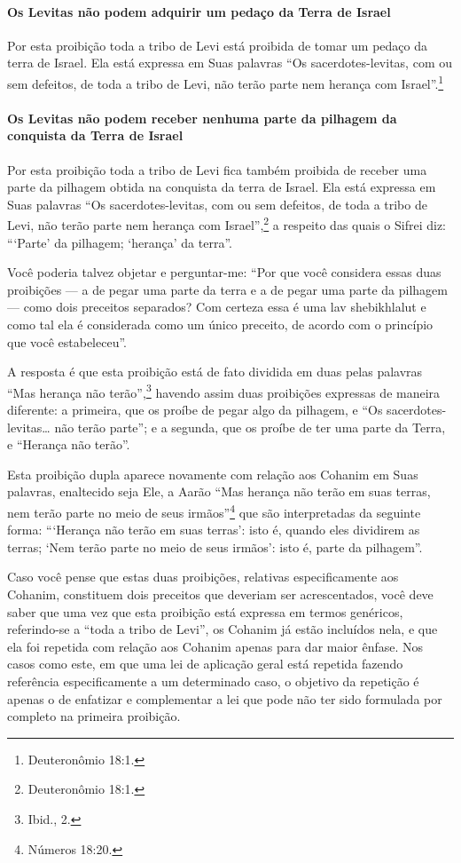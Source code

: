 \paragraph{Os Levitas não podem adquirir um pedaço da Terra de Israel}

Por esta proibição toda a tribo de Levi está proibida de tomar um pedaço
da terra de Israel. Ela está expressa em Suas palavras ``Os sacerdotes-levitas, com ou sem defeitos, de toda a tribo de Levi, não terão parte
nem herança com Israel''.\footnote{Deuteronômio 18:1.}

\paragraph{Os Levitas não podem receber nenhuma parte da pilhagem da conquista
da Terra de Israel}

Por esta proibição toda a tribo de Levi fica também proibida de receber
uma parte da pilhagem obtida na conquista da terra de Israel. Ela está
expressa em Suas palavras ``Os sacerdotes-levitas, com ou sem defeitos,
de toda a tribo de Levi, não terão parte nem herança com Israel'',\footnote{Deuteronômio 18:1.} a respeito das quais o Sifrei diz: ```Parte' da
pilhagem; `herança' da terra''.

Você poderia talvez objetar e perguntar-me: ``Por que você considera
essas duas proibições --- a de pegar uma parte da terra e a de pegar uma
parte da pilhagem --- como dois preceitos separados? Com certeza essa é
uma lav shebikhlalut\starr{} e como tal ela é
considerada como um único preceito, de acordo com o princípio que você
estabeleceu''.

A resposta é que esta proibição está de fato dividida em duas pelas
palavras ``Mas herança não terão'',\footnote{Ibid., 2.} havendo assim duas
proibições expressas de maneira diferente: a primeira, que os proíbe de
pegar algo da pilhagem, e ``Os sacerdotes-levitas\ldots{} não terão parte'';
e a segunda, que os proíbe de ter uma parte da Terra, e ``Herança não
terão''.

Esta proibição dupla aparece novamente com relação aos Cohanim em
Suas palavras, enaltecido seja Ele, a Aarão ``Mas herança não terão em
suas terras, nem terão parte no meio de seus irmãos''\footnote{Números 18:20.}
que são interpretadas da seguinte forma: ```Herança não terão em suas
terras': isto é, quando eles dividirem as terras; `Nem terão parte no
meio de seus irmãos': isto é, parte da pilhagem''.

Caso você pense que estas duas proibições, relativas especificamente
aos Cohanim, constituem dois preceitos que deveriam ser
acrescentados, você deve saber que uma vez que esta proibição está
expressa em termos genéricos, referindo-se a ``toda a tribo de Levi'',
os Cohanim já estão incluídos nela, e que ela foi repetida com
relação aos Cohanim apenas para dar maior ênfase. Nos casos como
este, em que uma lei de aplicação geral está repetida fazendo referência
especificamente a um determinado caso, o objetivo da repetição é apenas
o de enfatizar e complementar a lei que pode não ter sido formulada por
completo na primeira proibição.

